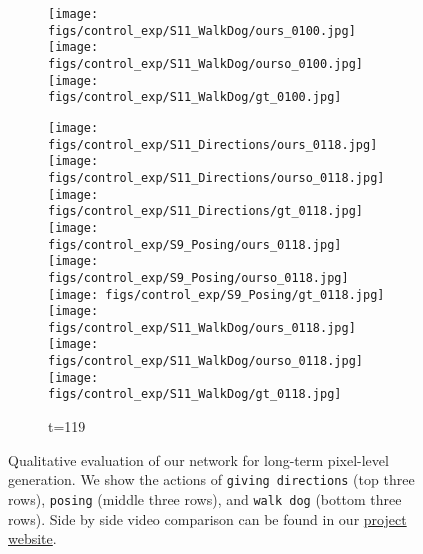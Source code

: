 \documentclass{article}
\begin{document}
\begin{appendix}
\begin{figure*}[!thbp]
\begin{subfigure}{0.12\linewidth}
  		\texttt{[image: figs/control\_exp/S11\_WalkDog/ours\_0100.jpg]}
  		\texttt{[image: figs/control\_exp/S11\_WalkDog/ourso\_0100.jpg]}
  		\vspace{.2cm}
  		\texttt{[image: figs/control\_exp/S11\_WalkDog/gt\_0100.jpg]}
	\end{subfigure}
	\begin{subfigure}{0.12\linewidth}
        \caption*{t=119}
        \vspace{-7pt}
	    \texttt{[image: figs/control\_exp/S11\_Directions/ours\_0118.jpg]}
	    \texttt{[image: figs/control\_exp/S11\_Directions/ourso\_0118.jpg]}
	    \vspace{.2cm}
  		\texttt{[image: figs/control\_exp/S11\_Directions/gt\_0118.jpg]}
  		\texttt{[image: figs/control\_exp/S9\_Posing/ours\_0118.jpg]}
  		\texttt{[image: figs/control\_exp/S9\_Posing/ourso\_0118.jpg]}
  		\vspace{.2cm}
  		\texttt{[image: figs/control\_exp/S9\_Posing/gt\_0118.jpg]}
  		\texttt{[image: figs/control\_exp/S11\_WalkDog/ours\_0118.jpg]}
  		\texttt{[image: figs/control\_exp/S11\_WalkDog/ourso\_0118.jpg]}
  		\vspace{.2cm}
  		\texttt{[image: figs/control\_exp/S11\_WalkDog/gt\_0118.jpg]}
	\end{subfigure}
    \vspace{-10pt}
    \caption{Qualitative evaluation of our network for long-term pixel-level generation. We show the actions of \texttt{giving directions} (top three rows), \texttt{posing} (middle three rows), and \texttt{walk dog} (bottom three rows). Side by side video comparison can be found in our \href{https://goo.gl/U7UOfy}{project website}.}
\label{fig:h36mgtft}
\vspace{-40pt}
\end{figure*}

\clearpage


\end{appendix}
\end{document}
